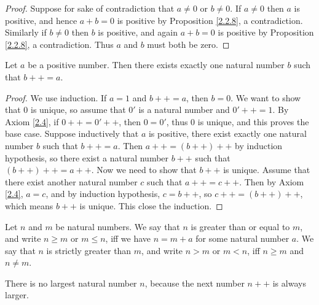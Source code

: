 \begin{proof}
Suppose for sake of contradiction that \(a \neq 0\) or \(b \neq 0\).
If \(a \neq 0\) then \(a\) is positive, and hence \(a + b = 0\) is positive by Proposition \ref{2.2.8}, a contradiction.
Similarly if \(b \neq 0\) then \(b\) is positive, and again \(a + b = 0\) is positive by Proposition \ref{2.2.8}, a contradiction.
Thus \(a\) and \(b\) must both be zero.
\end{proof}

\begin{lemma}\label{2.2.10}
Let \(a\) be a positive number.
Then there exists exactly one natural number \(b\) such that \(b++ = a\).
\end{lemma}

\begin{proof}
We use induction.
If \(a = 1\) and \(b++ = a\), then \(b = 0\).
We want to show that \(0\) is unique, so assume that \(0'\) is a natural number and \(0'++ = 1\).
By Axiom \ref{2.4}, if \(0++ = 0'++\), then \(0 = 0'\), thus \(0\) is unique, and this proves the base case.
Suppose inductively that \(a\) is positive, there exist exactly one natural number \(b\) such that \(b++ = a\).
Then \(a++ = (b++)++\) by induction hypothesis, so there exist a natural number \(b++\) such that \((b++)++ = a++\).
Now we need to show that \(b++\) is unique.
Assume that there exist another natural number \(c\) such that \(a++ = c++\).
Then by Axiom \ref{2.4}, \(a = c\), and by induction hypothesis, \(c = b++\), so \(c++ = (b++)++\), which means \(b++\) is unique.
This close the induction.
\end{proof}

\begin{definition}\label{2.2.11}
Let \(n\) and \(m\) be natural numbers.
We say that \(n\) is greater than or equal to \(m\), and write \(n \geq m\) or \(m \leq n\), iff we have \(n = m + a\) for some natural number \(a\).
We say that \(n\) is strictly greater than \(m\), and write \(n > m\) or \(m < n\), iff \(n \geq m\) and \(n \neq m\).
\end{definition}

\begin{note}
There is no largest natural number \(n\), because the next number \(n++\) is always larger.
\end{note}

